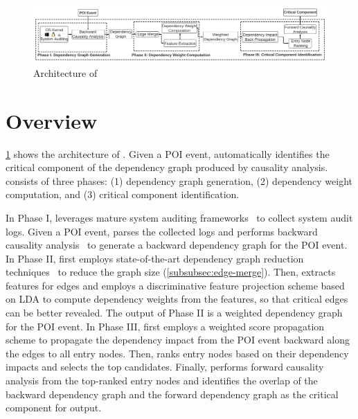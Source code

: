 
\begin{figure}[t]
    \centering
    \includegraphics[width=\textwidth,clip]{figs/architecture.pdf}
    \caption{Architecture of \tool}
    \label{fig:architecture}
\end{figure}


\section{Overview}
\label{sec:overview}



\cref{fig:architecture} shows the architecture of \tool.
%
Given a POI event, \tool automatically identifies the critical component of the dependency graph produced by causality analysis.
%
\tool consists of three phases: (1) dependency graph generation, (2) dependency weight computation, and (3) critical component identification.

In Phase I, \tool leverages mature system auditing frameworks~\cite{auditd,etw,dtrace,sysdig}
to collect system audit logs.
Given a POI event, \tool parses the collected logs and performs backward causality analysis~\cite{backtracking,backtracking2} to generate a backward dependency graph for the POI event. 
In Phase II, \tool first employs state-of-the-art dependency graph reduction techniques~\cite{reduction} to reduce the graph size
(\cref{subsubsec:edge-merge}).
Then, \tool extracts features for edges
and employs a discriminative feature projection scheme based on LDA to compute dependency weights from the features, so that critical edges can be better revealed.
The output of Phase II is a weighted dependency graph for the POI event.
In Phase III, \tool first employs a weighted score propagation scheme to
propagate the dependency impact from the POI event 
backward along the edges to all entry nodes.
Then, \tool ranks entry nodes based on their dependency impacts and selects the top candidates.
Finally, \tool performs forward causality analysis from the top-ranked entry nodes and identifies the overlap of the backward dependency graph and the forward dependency graph as the critical component for output. 




